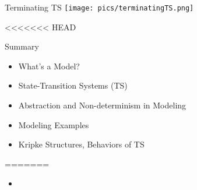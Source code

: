 \documentclass{beamer}
\begin{document}
\begin{frame}{Terminating TS}
\texttt{[image: pics/terminatingTS.png]}
\end{frame}

<<<<<<< HEAD
\begin{frame}{Summary}
\begin{itemize}
\item What's a Model?

\item State-Transition Systems (TS)

\item Abstraction and Non-determinism in Modeling

\item Modeling Examples

\item Kripke Structures, Behaviors of TS
\end{itemize}
\end{frame}






=======
\begin{frame}{}
\end{frame}

\begin{frame}{}
\begin{itemize}
\item

\end{itemize}
\end{frame}

\begin{frame}{}

\end{frame}
\end{document}
